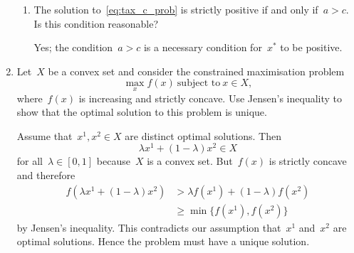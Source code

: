 \begin{enumerate}
\begin{enumerate}
		\item
		The solution to~\eqref{eq:tax_c_prob} is strictly positive if and only if~$a>c$.
		Is this condition reasonable?
		\begin{solution}
			Yes; the condition~$a>c$ is a necessary condition for~$x^*$ to be positive.
		\end{solution}

	\end{enumerate}

	\item
	Let~$X$ be a convex set and consider the constrained maximisation problem
	\[ \max_xf(x)\ \text{subject to}\ x\in X, \]
	where~$f(x)$ is increasing and strictly concave.
	Use Jensen's inequality to show that the optimal solution to this problem is unique.
	\begin{solution}
		Assume that~$x^1,x^2\in X$ are distinct optimal solutions.
		Then
		\[ \lambda x^1+(1-\lambda)x^2\in X\]
		for all~$\lambda\in[0,1]$ because~$X$ is a convex set.
		But~$f(x)$ is strictly concave and therefore
		\begin{align}
			f(\lambda x^1+(1-\lambda)x^2)
			&> \lambda f(x^1)+(1-\lambda)f(x^2)\\
			&\ge \min\{f(x^1),f(x^2)\}
		\end{align}
		by Jensen's inequality.
		This contradicts our assumption that~$x^1$ and~$x^2$ are optimal solutions.
		Hence the problem must have a unique solution.
	\end{solution}

\end{enumerate}
